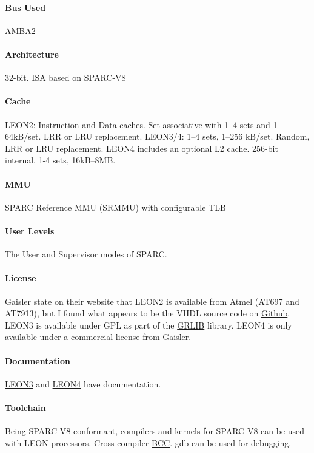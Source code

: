 \documentclass[11pt]{article} %
\begin{document}
\paragraph{Bus Used} AMBA2
\paragraph{Architecture} 32-bit. ISA based on SPARC-V8
\paragraph{Cache} LEON2: Instruction and Data caches. Set-associative with 1--4 sets and 1--64kB/set. LRR or LRU replacement. LEON3/4: 1--4 sets, 1--256 kB/set. Random, LRR or LRU replacement. LEON4 includes an optional L2 cache. 256-bit internal, 1-4 sets, 16kB--8MB.
\paragraph{MMU} SPARC Reference MMU (SRMMU) with configurable TLB
\paragraph{User Levels} The User and Supervisor modes of SPARC.
\paragraph{License} Gaisler state on their website that LEON2 is available from Atmel (AT697 and AT7913), but I found what appears to be the VHDL source code on \href{https://github.com/Galland/LEON2}{Github}. LEON3 is available under GPL as part of the \href{http://www.gaisler.com/index.php/products/ipcores/soclibrary}{GRLIB} library. LEON4 is only available under a commercial license from Gaisler.
\paragraph{Documentation} \href{http://www.gaisler.com/doc/leon3_product_sheet.pdf}{LEON3} and \href{http://www.gaisler.com/doc/LEON4_32-bit_processor_core.pdf}{LEON4} have documentation.
\paragraph{Toolchain} Being SPARC V8 conformant, compilers and kernels for SPARC V8 can be used with LEON processors. Cross compiler \href{http://www.gaisler.com/index.php/products?option=com_content&task=view&id=147}{BCC}. gdb can be used for debugging.
\end{document}
